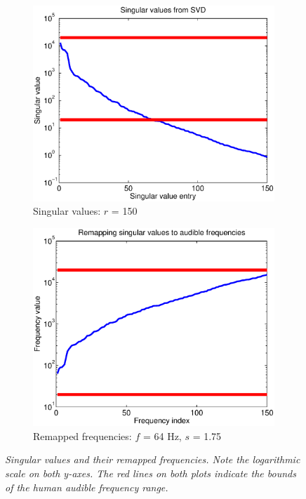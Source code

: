 \documentclass[11pt]{article}
\begin{document}
\begin{figure}
	\begin{subfigure}[h]{0.5\textwidth}
		\includegraphics[width=\textwidth]{figures/singulars.eps}
		\caption{Singular values: $r$ = 150} 
		\label{fig:singulars}
	\end{subfigure}
	\begin{subfigure}[h]{0.5\textwidth}
		\includegraphics[width=\textwidth]{figures/remap_freqs.eps}
		\caption{Remapped frequencies: $f$ = 64 Hz, $s$ = 1.75}
		\label{fig:freqs}
	\end{subfigure}
	\caption{\em Singular values and their remapped frequencies. Note the logarithmic scale on both y-axes. The red lines on both plots indicate the bounds of the human audible frequency range.}
\end{figure}
\end{document}
